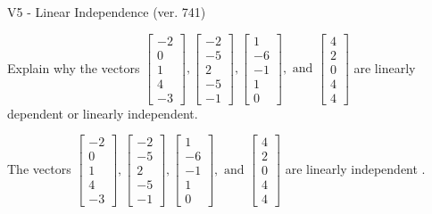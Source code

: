 \begin{exercise}
  \begin{exerciseTitle}V5 - Linear Independence (ver. 741)\end{exerciseTitle}
  \begin{exerciseStatement}
    Explain why the vectors \(\left[\begin{array}{r}
-2 \\
0 \\
1 \\
4 \\
-3
\end{array}\right] , \left[\begin{array}{r}
-2 \\
-5 \\
2 \\
-5 \\
-1
\end{array}\right] , \left[\begin{array}{r}
1 \\
-6 \\
-1 \\
1 \\
0
\end{array}\right] , \text{ and } \left[\begin{array}{r}
4 \\
2 \\
0 \\
4 \\
4
\end{array}\right]\) are linearly dependent or linearly independent.	


  \end{exerciseStatement}
  \begin{exerciseAnswer}
   The vectors \(\left[\begin{array}{r}
-2 \\
0 \\
1 \\
4 \\
-3
\end{array}\right] , \left[\begin{array}{r}
-2 \\
-5 \\
2 \\
-5 \\
-1
\end{array}\right] , \left[\begin{array}{r}
1 \\
-6 \\
-1 \\
1 \\
0
\end{array}\right] , \text{ and } \left[\begin{array}{r}
4 \\
2 \\
0 \\
4 \\
4
\end{array}\right]\) are 
  	 linearly independent  .
  


  \end{exerciseAnswer}
\end{exercise}
